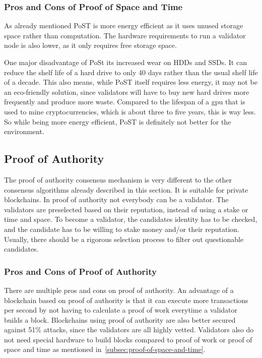 \subsubsection{Pros and Cons of Proof of Space and Time}
As already mentioned PoST is more energy efficient as it uses unused storage space rather than computation.
The hardware requirements to run a validator node is also lower, as it only requires free storage space.

One major disadvantage of PoSt its increased wear on HDDs and SSDs.
It can reduce the shelf life of a hard drive to only 40 days rather than the usual shelf life of a decade.
This also means, while PoST itself requires less energy, it may not be an eco-friendly solution, since validators will have to buy new hard drives more frequently and produce more waste.
Compared to the lifespan of a gpu that is used to mine cryptocurrencies, which is about three to five years, this is way less.
So while being more energy efficient, PoST is definitely not better for the environment.\cite{euronews-chia, devicetest-gpu-lifespan, supraoracles-post}

\subsection{Proof of Authority}\label{subsec:proof-of-authority}
The proof of authority consensus mechanism is very different to the other consensus algorithms already described in this section.
It is suitable for private blockchains.
In proof of authority not everybody can be a validator.
The validators are preselected based on their reputation, instead of using a stake or time and space.
To become a validator, the candidates identity has to be checked, and the candidate has to be willing to stake money and/or their reputation.
Usually, there should be a rigorous selection process to filter out questionable candidates.\cite{coindesk-poa}

\subsubsection{Pros and Cons of Proof of Authority}
There are multiple pros and cons on proof of authority.
An advantage of a blockchain based on proof of authority is that it can execute more transactions per second by not having to calculate a proof of work everytime a validator builds a block.
Blockchains using proof of authority are also better secured against 51\% attacks, since the validators are all highly vetted.
Validators also do not need special hardware to build blocks compared to proof of work or proof of space and time as mentioned in\ \ref{subsec:proof-of-space-and-time}.

